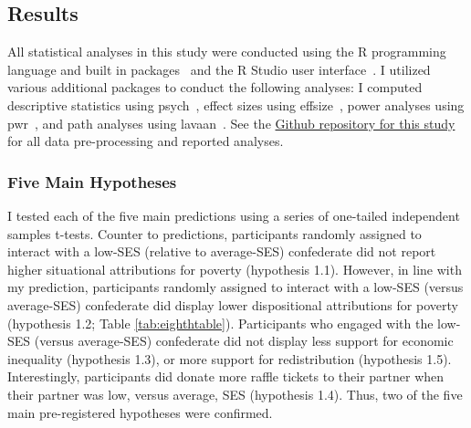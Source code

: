 \documentclass{sfuthesis}
\begin{document}
\subsection{Results}

All statistical analyses in this study were conducted using the R programming language and built in packages~\cite{rcore} and the R Studio user interface~\cite{rstudio16}. I utilized various additional packages to conduct the following analyses: I computed descriptive statistics using psych~\cite{revelle17}, effect sizes using effsize~\cite{torchiano17}, power analyses using pwr~\cite{champely18}, and path analyses using lavaan~\cite{rosseel12}. See the \href{https://github.com/dwiwad/Dissertation/tree/master/Study3a_and_3b}{Github repository for this study} for all data pre-processing and reported analyses.

\subsubsection{Five Main Hypotheses}

I tested each of the five main predictions using a series of one-tailed independent samples t-tests. Counter to predictions, participants randomly assigned to interact with a low-SES (relative to average-SES) confederate did not report higher situational attributions for poverty (hypothesis 1.1). However, in line with my prediction, participants randomly assigned to interact with a low-SES (versus average-SES) confederate did display lower dispositional attributions for poverty (hypothesis 1.2; Table \ref{tab:eighthtable}). Participants who engaged with the low-SES (versus average-SES) confederate did not display less support for economic inequality (hypothesis 1.3), or more support for redistribution (hypothesis 1.5). Interestingly, participants did donate more raffle tickets to their partner when their partner was low, versus average, SES (hypothesis 1.4). Thus, two of the five main pre-registered hypotheses were confirmed.
\end{document}
